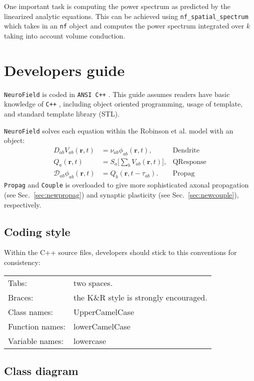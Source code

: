 \documentclass[12pt,a4paper]{article}
\newcommand{\type}[1]{ {\small\small\tt #1} }
\newcommand{\NF}[0]{ \type{NeuroField}}
\begin{document}
One important task is computing the power spectrum as predicted by the linearized analytic equations. This can be achieved using \type{nf\_spatial\_spectrum} which takes in an \type{nf} object and computes the power spectrum integrated over $k$ taking into account volume conduction. 

\pagebreak
\section{Developers guide}

\NF is coded in \type{ANSI C++}. This guide assumes readers have basic knowledge of \type{C++}, including object oriented programming, usage of template, and standard template library (STL). %

\NF solves each equation within the Robinson et al. model with an object:
\begin{align*}
	D_{ab}V_{ab}(\mathbf{r},t) &= \nu_{ab}\phi_{ab}(\mathbf{r},t), & \mathrm{Dendrite}\\
					  Q_a(\mathbf{r},t) &= S_a \big[\sum_b V_{ab}(\mathbf{r},t) \big], & \mathrm{QResponse}\\
	\mathcal{D}_{ab}\phi_{ab}(\mathbf{r},t) &= Q_b(\mathbf{r},t-\tau_{ab}).&  \mathrm{Propag}
\end{align*}
\type{Propag} and \type{Couple} is overloaded to give more sophisticated axonal propagation (see Sec.~\ref{sec:newpropag}) and synaptic plasticity (see Sec.~\ref{sec:newcouple}), respectively.

\subsection{Coding style}

Within the C++ source files, developers should stick to this conventions for consistency:

\begin{tabular}{ l l }
	Tabs:& two spaces.\\
	Braces:& the K\&R style is strongly encouraged.\\
	Class names:&UpperCamelCase\\
	Function names:&lowerCamelCase\\
	Variable names:&lowercase
\end{tabular}

\subsection{Class diagram}
\end{document}
